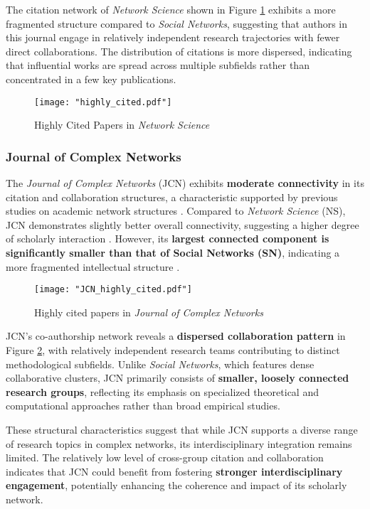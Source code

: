 \documentclass[twocolumn]{article}
\begin{document}
	The citation network of \textit{Network Science} shown in Figure \ref{fig.fig5} exhibits a more fragmented structure compared to \textit{Social Networks}, suggesting that authors in this journal engage in relatively independent research trajectories with fewer direct collaborations. The distribution of citations is more dispersed, indicating that influential works are spread across multiple subfields rather than concentrated in a few key publications.
	
	\begin{figure}[htbp]
		\centering
		\texttt{[image: "highly\_cited.pdf"]}
		\caption{Highly Cited Papers in \textit{Network Science}}
		\label{fig.fig5}
	\end{figure}
	
	\subsubsection*{Journal of Complex Networks}
	
	The \textit{Journal of Complex Networks} (JCN) exhibits \textbf{moderate connectivity} in its citation and collaboration structures, a characteristic supported by previous studies on academic network structures \cite{newman2001scientific, Liu2005}. Compared to \textit{Network Science} (NS), JCN demonstrates slightly better overall connectivity, suggesting a higher degree of scholarly interaction \cite{Barabasi2002}. However, its \textbf{largest connected component is significantly smaller than that of Social Networks (SN)}, indicating a more fragmented intellectual structure \cite{Otte2002, Borgatti2009}.
	
	
	\begin{figure}[htbp]
		\centering
		\texttt{[image: "JCN\_highly\_cited.pdf"]}
		\caption{Highly cited papers in \textit{Journal of Complex Networks}}
		\label{fig.fig6}
	\end{figure}
	
	JCN's co-authorship network reveals a \textbf{dispersed collaboration pattern} in Figure \ref{fig.fig6}, with relatively independent research teams contributing to distinct methodological subfields. Unlike \textit{Social Networks}, which features dense collaborative clusters, JCN primarily consists of \textbf{smaller, loosely connected research groups}, reflecting its emphasis on specialized theoretical and computational approaches rather than broad empirical studies.
	
	These structural characteristics suggest that while JCN supports a diverse range of research topics in complex networks, its interdisciplinary integration remains limited. The relatively low level of cross-group citation and collaboration indicates that JCN could benefit from fostering \textbf{stronger interdisciplinary engagement}, potentially enhancing the coherence and impact of its scholarly network.
	
\end{document}
